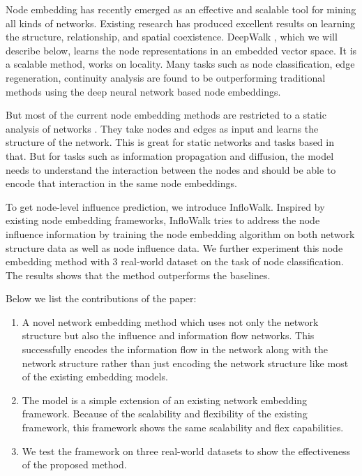 Node embedding has recently emerged as an effective and scalable tool for mining all kinds of networks. Existing research has produced excellent results on learning the structure, relationship, and spatial coexistence. DeepWalk \cite{perozzi2014deepwalk}, which we will describe below, learns the node representations in an embedded vector space. It is a scalable method, works on locality. Many tasks such as node classification, edge regeneration, continuity analysis are found to be outperforming traditional methods using the deep neural network based node embeddings.

But most of the current node embedding methods are restricted to a static analysis of networks \cite{chen2018tutorial, grover2016node2vec, tang2015line, perozzi2017don, tu2016max, cao2016deep, abu2017watch, cao2015grarep}. They take nodes and edges as input and learns the structure of the network. This is great for static networks and tasks based in that. But for tasks such as information propagation and diffusion, the model needs to understand the interaction between the nodes and should be able to encode that interaction in the same node embeddings.

To get node-level influence prediction, we introduce InfloWalk. Inspired by existing node embedding frameworks, InfloWalk tries to address the node influence information by training the node embedding algorithm on both network structure data as well as node influence data. We further experiment this node embedding method with 3 real-world dataset on the task of node classification. The results shows that the method outperforms the baselines.

Below we list the contributions of the paper:
\begin{enumerate}
\item A novel network embedding method which uses not only the network structure but also the influence and information flow networks. This successfully encodes the information flow in the network along with the network structure rather than just encoding the network structure like most of the existing embedding models.
\item The model is a simple extension of an existing network embedding framework. Because of the scalability and flexibility of the existing framework, this framework shows the same scalability and flex capabilities.
\item We test the framework on three real-world datasets to show the effectiveness of the proposed method.
\end{enumerate}



